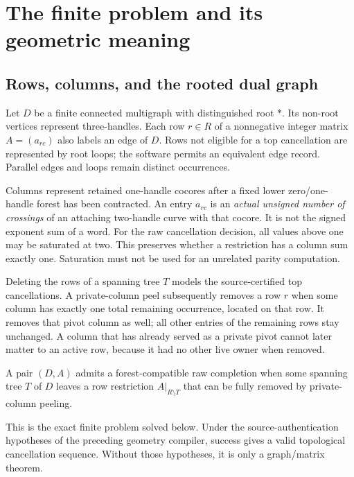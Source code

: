 \section{The finite problem and its geometric meaning}
\label{sec:model}

\subsection{Rows, columns, and the rooted dual graph}

Let $D$ be a finite connected multigraph with distinguished root $\ast$.
Its non-root vertices represent three-handles.  Each row $r\in R$ of a
nonnegative integer matrix $A=(a_{rc})$ also labels an edge of $D$.
Rows not eligible for a top cancellation are represented by root loops;
the software permits an equivalent  edge record.  Parallel
edges and loops remain distinct occurrences.

Columns represent retained one-handle cocores after a fixed lower
zero/one-handle forest has been contracted.  An entry $a_{rc}$ is an
\emph{actual unsigned number of crossings} of an attaching two-handle
curve with that cocore.  It is not the signed exponent sum of a word.
For the raw cancellation decision, all values above one may be saturated
at two.  This preserves whether a restriction has a column sum exactly
one.  Saturation must not be used for an unrelated parity computation.

Deleting the rows of a spanning tree $T$ models the source-certified
top cancellations.  A private-column peel subsequently removes a row
$r$ when some column has exactly one total remaining occurrence, located
on that row.  It removes that pivot column as well; all other entries of
the remaining rows stay unchanged.  A column that has already served as
a private pivot cannot later matter to an active row, because it had
no other live owner when removed.

\begin{definition}
A pair $(D,A)$ admits a forest-compatible raw completion when some spanning
tree $T$ of $D$ leaves a row restriction $A|_{R\setminus T}$ that can be
fully removed by private-column peeling.
\end{definition}

This is the exact finite problem solved below.  Under the source-authentication
hypotheses of the preceding geometry compiler, success gives a valid
topological cancellation sequence.  Without those hypotheses, it is only
a graph/matrix theorem.

